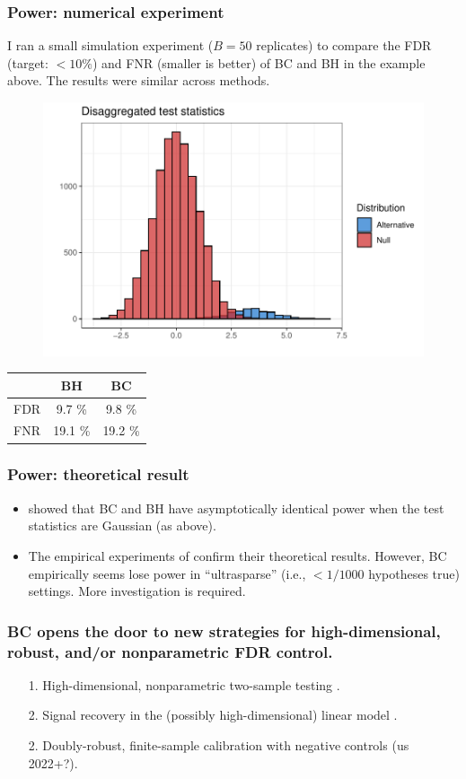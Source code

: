 \documentclass{beamer}
\begin{document}
\begin{frame}
\frametitle{Power: numerical experiment}
I ran a small simulation experiment ($B = 50$ replicates) to compare the FDR (target: $< 10\%$) and FNR (smaller is better) of BC and BH in the example above. The results were similar across methods.

\begin{figure}
	\centering
	\includegraphics[width=0.5\linewidth]{disag_test_stats}
\end{figure}

\centering
\begin{tabular}{|c|c|c|}
	\hline 
	& BH & BC \\ 
	\hline 
	FDR & 9.7 \% & 9.8 \% \\ 
	\hline 
	FNR & 19.1 \% & 19.2 \% \\ 
	\hline 
\end{tabular} 
\end{frame}

\begin{frame}
\frametitle{Power: theoretical result}
\begin{itemize}
\item \textcite{Arias-Castro2017} showed that BC and BH have asymptotically identical power when the test statistics are Gaussian (as above).
\item The empirical experiments of \textcite{Arias-Castro2017} confirm their theoretical results. However, BC empirically seems lose power in ``ultrasparse'' (i.e., $< 1/1000$ hypotheses true) settings. More investigation is required.
\end{itemize}
\end{frame}

\begin{frame}
\frametitle{BC opens the door to new strategies for high-dimensional, robust, and/or nonparametric FDR control.}

\begin{itemize}
\item[1.] High-dimensional, nonparametric two-sample testing \parencite{Ge2021}.
\item[2.] Signal recovery in the (possibly high-dimensional) linear model \parencite{Barber2015}.
\item[2.] Doubly-robust, finite-sample calibration with negative controls (us 2022+?).
\end{itemize}
\end{frame}



\printbibliography
\end{document}
